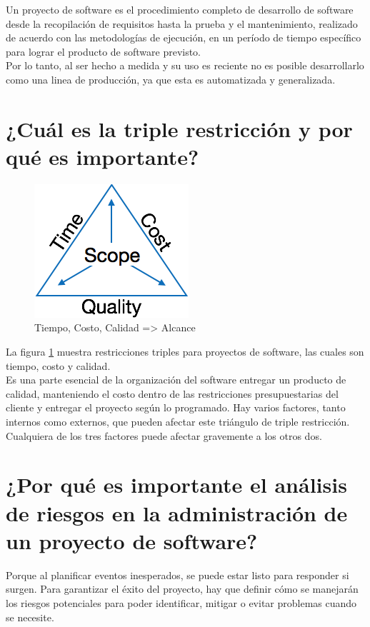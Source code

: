 \documentclass[12pt,twoside]{article}
\begin{document}
Un proyecto de software es el procedimiento completo de desarrollo de software 
desde la recopilación de requisitos hasta la prueba y el mantenimiento, 
realizado de acuerdo con las metodologías de ejecución, en un período de tiempo 
específico para lograr el producto de software previsto.\\
    
Por lo tanto, al ser hecho a medida y su uso es reciente no es posible desarrollarlo
como una linea de producción, ya que esta es automatizada y generalizada.

\section{¿Cuál es la triple restricción y por qué es importante?}
\begin{figure}[htb]
    \centering
    \includegraphics{img/time_cost_quality.png}
    \caption{Tiempo, Costo, Calidad => Alcance}
    \label{fig:triangulo}
\end{figure}

La figura \ref{fig:triangulo} muestra restricciones triples para proyectos de
software, las cuales son tiempo, costo y calidad.\\

Es una parte esencial de la organización del software entregar un producto de 
calidad, manteniendo el costo dentro de las restricciones presupuestarias del 
cliente y entregar el proyecto según lo programado. Hay varios factores, tanto 
internos como externos, que pueden afectar este triángulo de triple restricción. 
Cualquiera de los tres factores puede afectar gravemente a los otros dos.\\

\section{¿Por qué es importante el análisis de riesgos en la administración de 
un proyecto de software?}

Porque al planificar eventos inesperados, se puede estar listo para responder 
si surgen. Para garantizar el éxito del proyecto, hay que definir cómo se 
manejarán los riesgos potenciales para poder identificar, mitigar o evitar 
problemas cuando se necesite. 
\end{document}
